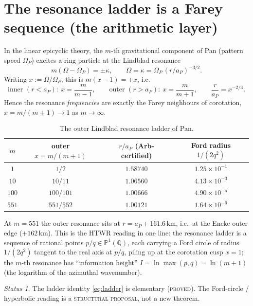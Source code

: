 \documentclass[11pt]{article}
\theoremstyle{remark}
\newtheorem*{status}{Status}
\newcommand{\Q}{\mathbb{Q}}
\newcommand{\PP}{\mathbb{P}}
\begin{document}
\section{The resonance ladder is a Farey sequence (the arithmetic layer)}
\label{sec:farey}

In the linear epicyclic theory, the $m$-th gravitational component of Pan
(pattern speed $\Omega_P$) excites a ring particle at the Lindblad resonance
\begin{equation}\label{eq:lindblad}
m(\Omega-\Omega_P)=\pm\kappa,\qquad
\Omega=\kappa=\Omega_P\,(r/a_P)^{-3/2}.
\end{equation}
Writing $x:=\Omega/\Omega_P$, this is $m(x-1)=\pm x$, i.e.\
\begin{equation}\label{eq:ladder}
\text{inner }(r<a_P):\ x=\frac{m}{m-1},\qquad
\text{outer }(r>a_P):\ x=\frac{m}{m+1},\qquad
\frac{r}{a_P}=x^{-2/3}.
\end{equation}
Hence the resonance \emph{frequencies} are exactly the Farey neighbours of
corotation, $x=m/(m\pm1)\to1$ as $m\to\infty$.

\begin{table}[ht]
\centering
\begin{tabular}{c c c c}
\toprule
$m$ & outer $x=m/(m+1)$ & $r/a_P$ (Arb-certified) & Ford radius $1/(2q^2)$\\
\midrule
$1$ & $1/2$ & $1.58740$ & $1.25\times10^{-1}$\\
$10$ & $10/11$ & $1.06560$ & $4.13\times10^{-3}$\\
$100$ & $100/101$ & $1.00666$ & $4.90\times10^{-5}$\\
$551$ & $551/552$ & $1.00121$ & $1.64\times10^{-6}$\\
\bottomrule
\end{tabular}
\caption{The outer Lindblad resonance ladder of Pan.}
\label{tab:ladder}
\end{table}

At $m=551$ the outer resonance sits at $r=a_P+161.6$\,km, i.e.\ at the Encke
outer edge ($+162$\,km).  This is the HTWR reading in one line: the resonance
ladder is a sequence of rational points $p/q\in\PP^1(\Q)$, each carrying a Ford
circle of radius $1/(2q^2)$ tangent to the real axis at $p/q$, piling up at the
corotation cusp $x=1$; the $m$-th resonance has ``information height''
$I=\ln\max(p,q)=\ln(m+1)$ (the logarithm of the azimuthal wavenumber).

\begin{status}
The ladder identity \eqref{eq:ladder} is elementary (\textsc{proved}).  The
Ford-circle / hyperbolic reading is a \textsc{structural proposal}, not a new
theorem.
\end{status}
\end{document}
